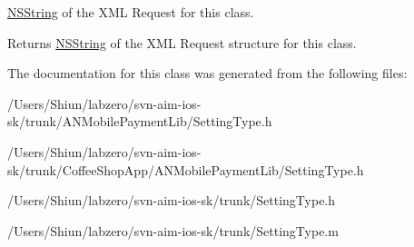 \hyperlink{class_n_s_string}{NSString} of the XML Request for this class. 

\begin{DoxyReturn}{Returns}
\hyperlink{class_n_s_string}{NSString} of the XML Request structure for this class. 
\end{DoxyReturn}


The documentation for this class was generated from the following files:\begin{DoxyCompactItemize}
\item 
/Users/Shiun/labzero/svn-\/aim-\/ios-\/sk/trunk/ANMobilePaymentLib/SettingType.h\item 
/Users/Shiun/labzero/svn-\/aim-\/ios-\/sk/trunk/CoffeeShopApp/ANMobilePaymentLib/SettingType.h\item 
/Users/Shiun/labzero/svn-\/aim-\/ios-\/sk/trunk/SettingType.h\item 
/Users/Shiun/labzero/svn-\/aim-\/ios-\/sk/trunk/SettingType.m\end{DoxyCompactItemize}
